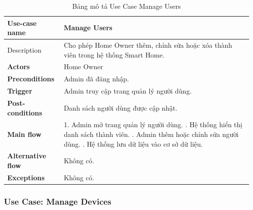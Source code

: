 \documentclass[a4paper,twoside]{article}
\begin{document}
\begin{table}[H]
\centering
\begin{tabular}{|l|p{10cm}|}
\hline
\textbf{Use-case name} & Manage Users \\ \hline
Description & Cho phép Home Owner thêm, chỉnh sửa hoặc xóa thành viên trong hệ thống Smart Home. \\ \hline
\textbf{Actors} & Home Owner \\ \hline
\textbf{Preconditions} &
Admin đã đăng nhập. \\ \hline
\textbf{Trigger} &
Admin truy cập trang quản lý người dùng. \\ \hline
\textbf{Post-conditions} &
Danh sách người dùng được cập nhật. \\ \hline
\textbf{Main flow} &
1. Admin mở trang quản lý người dùng. \newline
2. Hệ thống hiển thị danh sách thành viên. \newline
3. Admin thêm hoặc chỉnh sửa người dùng. \newline
4. Hệ thống lưu dữ liệu vào cơ sở dữ liệu. \\ \hline
\textbf{Alternative flow} &
Không có. \\ \hline
\textbf{Exceptions} &
Không có. \\ \hline
\end{tabular}
\caption{Bảng mô tả Use Case Manage Users}
\end{table}

\subsubsection{Use Case: Manage Devices}
\end{document}
